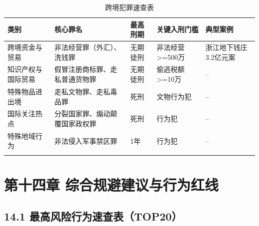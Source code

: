 \documentclass[12pt,a4paper]{article}
\begin{document}
\begin{longtable}{p{2cm}p{3cm}p{3cm}p{2cm}p{3cm}}
  \toprule
  \textbf{类别} & \textbf{核心罪名} & \textbf{最高刑期} & \textbf{关键入刑门槛} & \textbf{典型案例} \\
  \midrule
  跨境资金与贸易 & 非法经营罪（外汇）、洗钱罪 & 无期徒刑 & 非法经营>=500万 & 浙江地下钱庄3.2亿元案 \\
  知识产权与国际贸易 & 假冒注册商标罪、走私普通货物罪 & 无期徒刑 & 偷逃税额>=10万 & -- \\
  特殊物品进出境 & 走私文物罪、走私毒品罪 & 死刑 & 文物行为犯 & -- \\
  国际关注热点 & 分裂国家罪、煽动颠覆国家政权罪 & 死刑 & 行为犯 & -- \\
  特殊地域行为 & 非法侵入军事禁区罪 & 1年 & 行为犯 & -- \\
  \bottomrule
  \caption{跨境犯罪速查表}
\end{longtable}

\clearpage

\section{第十四章 综合规避建议与行为红线}

\subsection{14.1 最高风险行为速查表（TOP20）}
\end{document}
